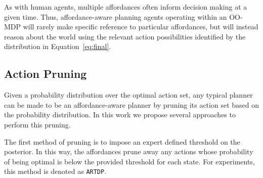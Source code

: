 \documentclass[conference]{IEEEtran}
\newcommand{\stnote}[1]{\textcolor{Blue}{\textbf{}}}
\newcommand{\dnote}[1]{\textcolor{Green}{\textbf{}}}
\begin{document}
  
As with human agents, multiple affordances often inform decision making at a given time.
Thus, affordance-aware planning agents operating within an OO-MDP will
rarely make specific reference to particular affordances, but will
instead reason about the world using the relevant action possibilities
identified by the distribution in Equation~\ref{eq:final}. 

\subsection{Action Pruning}
\label{sec:action_pruning}
Given a probability distribution over the optimal action set, any typical
planner can be made to be an affordance-aware planner by pruning its action
set based on the probability distribution. In this work we propose several approaches to perform this pruning.

The first method of pruning is to impose an expert defined threshold on the posterior. In this way, the affordances prune away any actions whose probability of being optimal is below the provided threshold for each state. For experiments, this method is denoted as \texttt{ARTDP}.
\end{document}
